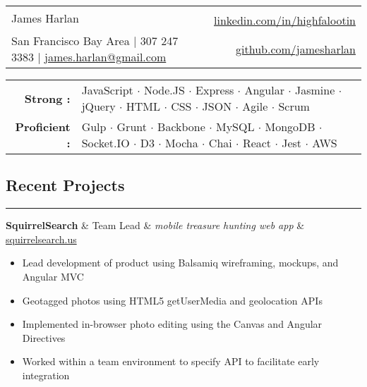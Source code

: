 \documentclass[10pt]{article}
\newenvironment{roles}
{ \vspace{0.25em}
  \begin{itemize}
    \setlength{\itemsep}{-0.75em}
    \setlength{\parskip}{0em}
    \setlength{\parsep}{-0.5em}
    \setlength{\partopsep}{0pt}
    \setlength{\topsep}{0pt}
}
{ \end{itemize}
  \vspace{0.5em}
}
\newenvironment{org}
{ \noindent
  \tabularx{\textwidth}{p{5cm} p{4cm} r Y }
}
{
  \endtabularx
  \vspace{-0.5em}
}
\newcommand*\minitem{
  \vspace{-0.25em}
  \item[$\cdot$]
  \vspace{-0.25em}
}
\newcommand*\nvssec{
  \vspace{-1.5em}
  \subsection*
}
\begin{document}
\begin{center}
\begin{tabularx}{1.0\textwidth}{l X r}
  \multirow{2}{*}{\Huge{James Harlan}}& &  \\
   & & \href{https://www.linkedin.com/in/highfalootin}{\color{blue}linkedin.com/in/highfalootin} \\
  San Francisco Bay Area $\vert$ 307 247 3383 $\vert$ \href{mailto:james.harlan@gmail.com}{\color{blue}james.harlan@gmail.com} & & \href{http://github.com/jamesharlan}{\color{blue}github.com/jamesharlan}
\end{tabularx}

\vspace{2mm}

\begin{tabularx}{\textwidth}{r X}
  \textbf{Strong : } & JavaScript $\cdot$ Node.JS $\cdot$ Express $\cdot$ Angular $\cdot$ Jasmine $\cdot$ jQuery $\cdot$ HTML $\cdot$ CSS $\cdot$ JSON $\cdot$  Agile $\cdot$ Scrum \\
  \textbf{Proficient : } & Gulp $\cdot$ Grunt $\cdot$ Backbone $\cdot$ MySQL $\cdot$ MongoDB $\cdot$ Socket.IO $\cdot$ D3 $\cdot$ Mocha $\cdot$ Chai $\cdot$ React $\cdot$ Jest $\cdot$ AWS \
\end{tabularx}

\end{center}
\vspace{-0.5em}
\nvssec{Recent Projects}
\vspace{-1.5em}
\noindent\rule{\textwidth}{0.5pt}

\begin{org}
  \textbf{SquirrelSearch} & Team Lead & \emph{mobile treasure hunting web app} & \href{http://squirrelsearch.us}{\color{blue}squirrelsearch.us} \\
\end{org}
\begin{roles}
  \minitem Lead development of product using Balsamiq wireframing, mockups, and Angular MVC\\
  \minitem Geotagged photos using HTML5 getUserMedia and geolocation APIs \\
  \minitem Implemented in-browser photo editing using the Canvas and Angular Directives\\
  \minitem Worked within a team environment to specify API to facilitate early integration
\end{roles}
\vspace{0.25em}
\end{document}
